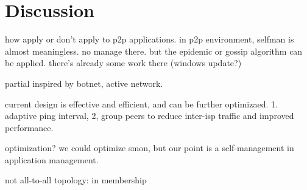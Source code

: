 \section{Discussion}
\label{sec:discuss}

how apply or don't apply to p2p applications. in p2p
environment, selfman is almost meaningless. no manage there. but
the epidemic or gossip algorithm can be applied. there's already
some work there (windows update?)

partial inspired by botnet, active network.

current design is effective and efficient, and can be further
optimizaed. 1. adaptive ping interval, 2, group peers to reduce
inter-isp traffic and improved performance.

optimization? we could optimize smon, but our point is a
self-management in application management.

not all-to-all topology: in membership
